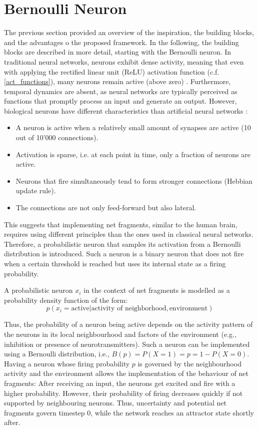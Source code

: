\section{Bernoulli Neuron}
The previous section provided an overview of the inspiration, the building blocks, and the advantages o the proposed framework. In the following, the building blocks are described in more detail, starting with the Bernoulli neuron.
In traditional neural networks, neurons exhibit dense activity, meaning that even with applying the rectified linear unit (ReLU) activation function (c.f. \eqref{act_functions}), many neurons remain active (above zero) . Furthermore, temporal dynamics are absent, as neural networks are typically perceived as functions that promptly process an input and generate an output. However, biological neurons have different characteristics than artificial neural networks :

\begin{itemize}
    \item A neuron is active when a relatively small amount of synapses are active (10 out of 10'000 connections). 
    \item Activation is sparse, i.e. at each point in time, only a fraction of neurons are active.
    \item Neurons that fire simultaneously tend to form stronger connections (Hebbian update rule).
    \item The connections are not only feed-forward but also lateral.
\end{itemize}

This suggests that implementing net fragments, similar to the human brain, requires using different principles than the ones used in classical neural networks. Therefore, a probabilistic neuron that samples its activation from a Bernoulli distribution is introduced.
Such a neuron is a binary neuron that does not fire when a certain threshold is reached but uses its internal state as a firing probability.

A probabilistic neuron $x_i$ in the context of net fragments is modelled as a probability density function of the form:
\begin{equation}
    p(x_i = \text{active} | \text{activity of neighborhood}, \text{environment}) 
\end{equation}

Thus, the probability of a neuron being active depends on the activity pattern of the neurons in its local neighbourhood and factors of the environment (e.g., inhibition or presence of neurotransmitters).
Such a neuron can be implemented using a Bernoulli distribution, i.e., $B(p) = P(X = 1) = p = 1 - P(X=0)$. Having a neuron whose firing probability $p$ is governed by the neighbourhood activity and the environment allows the implementation of the behaviour of net fragments: After receiving an input, the neurons get excited and fire with a higher probability. However, their probability of firing decreases quickly if not supported by neighbouring neurons. Thus, uncertainty and potential net fragments govern timestep 0, while the network reaches an attractor state shortly after. 

